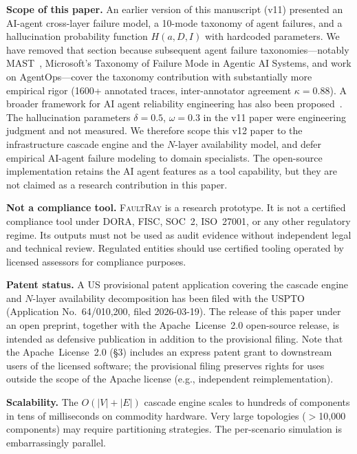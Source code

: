 \documentclass[10pt,twocolumn]{article}
\begin{document}
\textbf{Scope of this paper.}
An earlier version of this manuscript (v11) presented an AI-agent
cross-layer failure model, a 10-mode taxonomy of agent failures,
and a hallucination probability function $H(a, D, I)$ with
hardcoded parameters. We have removed that section because
subsequent agent failure taxonomies---notably
MAST~\cite{cemri2025mast}, Microsoft's Taxonomy of Failure Mode in
Agentic AI Systems, and work on AgentOps---cover the taxonomy
contribution with substantially more empirical rigor (1600+
annotated traces, inter-annotator agreement $\kappa = 0.88$).
A broader framework for AI agent reliability engineering has also
been proposed~\cite{airel2026}.
The
hallucination parameters $\delta = 0.5$, $\omega = 0.3$ in the v11
paper were engineering judgment and not measured. We therefore
scope this v12 paper to the infrastructure cascade engine and the
$N$-layer availability model, and defer empirical AI-agent failure
modeling to domain specialists. The open-source implementation
retains the AI agent features as a tool capability, but they are
not claimed as a research contribution in this paper.

\textbf{Not a compliance tool.}
\textsc{FaultRay} is a research prototype. It is not a certified
compliance tool under DORA, FISC, SOC~2, ISO~27001, or any other
regulatory regime. Its outputs must not be used as audit evidence
without independent legal and technical review. Regulated entities
should use certified tooling operated by licensed assessors for
compliance purposes.

\textbf{Patent status.}
A US provisional patent application covering the cascade engine and
$N$-layer availability decomposition has been filed with the USPTO
(Application No.~64/010,200, filed 2026-03-19). The release of this
paper under an open preprint, together with the Apache~License~2.0
open-source release, is intended as defensive publication in
addition to the provisional filing. Note that the Apache~License~2.0
(\S3) includes an express patent grant to downstream users of the
licensed software; the provisional filing preserves rights for
uses outside the scope of the Apache license (e.g., independent
reimplementation).

\textbf{Scalability.}
The $O(|V| + |E|)$ cascade engine scales to hundreds of components
in tens of milliseconds on commodity hardware. Very large
topologies ($>$10{,}000 components) may require partitioning
strategies. The per-scenario simulation is embarrassingly parallel.
\end{document}
